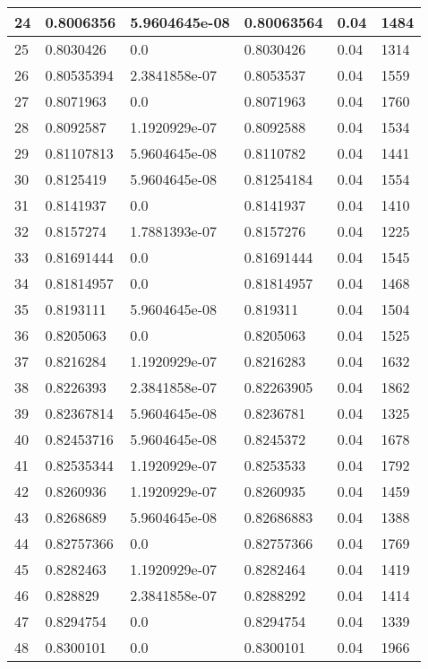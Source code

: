 \begin{longtable}{|l|l|l|l|l|l|}
24 & 0.8006356 & 5.9604645e-08 & 0.80063564 & 0.04 & 1484 \\ \hline 
25 & 0.8030426 & 0.0 & 0.8030426 & 0.04 & 1314 \\ \hline 
26 & 0.80535394 & 2.3841858e-07 & 0.8053537 & 0.04 & 1559 \\ \hline 
27 & 0.8071963 & 0.0 & 0.8071963 & 0.04 & 1760 \\ \hline 
28 & 0.8092587 & 1.1920929e-07 & 0.8092588 & 0.04 & 1534 \\ \hline 
29 & 0.81107813 & 5.9604645e-08 & 0.8110782 & 0.04 & 1441 \\ \hline 
30 & 0.8125419 & 5.9604645e-08 & 0.81254184 & 0.04 & 1554 \\ \hline 
31 & 0.8141937 & 0.0 & 0.8141937 & 0.04 & 1410 \\ \hline 
32 & 0.8157274 & 1.7881393e-07 & 0.8157276 & 0.04 & 1225 \\ \hline 
33 & 0.81691444 & 0.0 & 0.81691444 & 0.04 & 1545 \\ \hline 
34 & 0.81814957 & 0.0 & 0.81814957 & 0.04 & 1468 \\ \hline 
35 & 0.8193111 & 5.9604645e-08 & 0.819311 & 0.04 & 1504 \\ \hline 
36 & 0.8205063 & 0.0 & 0.8205063 & 0.04 & 1525 \\ \hline 
37 & 0.8216284 & 1.1920929e-07 & 0.8216283 & 0.04 & 1632 \\ \hline 
38 & 0.8226393 & 2.3841858e-07 & 0.82263905 & 0.04 & 1862 \\ \hline 
39 & 0.82367814 & 5.9604645e-08 & 0.8236781 & 0.04 & 1325 \\ \hline 
40 & 0.82453716 & 5.9604645e-08 & 0.8245372 & 0.04 & 1678 \\ \hline 
41 & 0.82535344 & 1.1920929e-07 & 0.8253533 & 0.04 & 1792 \\ \hline 
42 & 0.8260936 & 1.1920929e-07 & 0.8260935 & 0.04 & 1459 \\ \hline 
43 & 0.8268689 & 5.9604645e-08 & 0.82686883 & 0.04 & 1388 \\ \hline 
44 & 0.82757366 & 0.0 & 0.82757366 & 0.04 & 1769 \\ \hline 
45 & 0.8282463 & 1.1920929e-07 & 0.8282464 & 0.04 & 1419 \\ \hline 
46 & 0.828829 & 2.3841858e-07 & 0.8288292 & 0.04 & 1414 \\ \hline 
47 & 0.8294754 & 0.0 & 0.8294754 & 0.04 & 1339 \\ \hline 
48 & 0.8300101 & 0.0 & 0.8300101 & 0.04 & 1966 \\ \hline 

\end{longtable}
